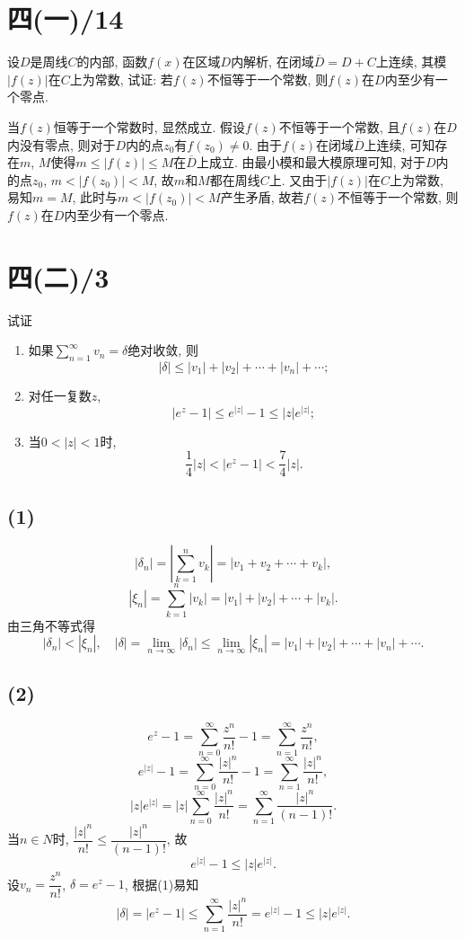 \documentclass[11pt,a4paper]{article}
\author{刘逸灏 (515370910207)}
\begin{document}
\maketitle

\section{四(一)/14}
\begin{problem}
设$D$是周线$C$的内部, 函数$f(x)$在区域$D$内解析, 在闭域$\overline{D}=D+C$上连续, 其模$|f(z)|$在$C$上为常数, 试证: 若$f(z)$不恒等于一个常数, 则$f(z)$在$D$内至少有一个零点.
\end{problem}

当$f(z)$恒等于一个常数时, 显然成立. 假设$f(z)$不恒等于一个常数, 且$f(z)$在$D$内没有零点, 则对于$D$内的点$z_0$有$f(z_0)\neq 0$. 由于$f(z)$在闭域$\overline{D}$上连续, 可知存在$m$, $M$使得$m\leqslant |f(z)|\leqslant M$在$\overline{D}$上成立.
由最小模和最大模原理可知, 对于$D$内的点$z_0$, $m<|f(z_0)|<M$, 故$m$和$M$都在周线$C$上. 又由于$|f(z)|$在$C$上为常数, 易知$m=M$, 此时与$m<|f(z_0)|<M$产生矛盾, 故若$f(z)$不恒等于一个常数, 则$f(z)$在$D$内至少有一个零点.

\section{四(二)/3}
\begin{problem}
试证
\begin{enumerate}
  \item 如果$\sum\limits_{n=1}^\infty v_n=\delta$绝对收敛, 则$$|\delta|\leqslant|v_1|+|v_2|+\cdots+|v_n|+\cdots;$$
  \item 对任一复数$z$, $$|e^z-1|\leqslant e^{|z|}-1\leqslant |z|e^{|z|};$$
  \item 当$0<|z|<1$时, $$\frac{1}{4}|z|<|e^z-1|<\frac{7}{4}|z|.$$
\end{enumerate}
\end{problem}

\subsection*{(1)}
$$|\delta_n|=\left|\sum_{k=1}^n v_k\right|=|v_1+v_2+\cdots+v_k|,$$
$$|\xi_n|=\sum_{k=1}^n |v_k|=|v_1|+|v_2|+\cdots+|v_k|.$$
由三角不等式得
$$|\delta_n|<|\xi_n|,\quad |\delta|=\lim_{n\to\infty}|\delta_n|\leqslant\lim_{n\to\infty}|\xi_n|=|v_1|+|v_2|+\cdots+|v_n|+\cdots.$$

\subsection*{(2)}
$$e^z-1=\sum_{n=0}^\infty\frac{z^n}{n!}-1=\sum_{n=1}^\infty\frac{z^n}{n!},$$
$$e^{|z|}-1=\sum_{n=0}^\infty\frac{|z|^n}{n!}-1=\sum_{n=1}^\infty\frac{|z|^n}{n!},$$
$$|z|e^{|z|}=|z|\sum_{n=0}^\infty\frac{|z|^n}{n!}=\sum_{n=1}^\infty\frac{|z|^n}{(n-1)!}.$$
当$n\in N$时, $\dfrac{|z|^n}{n!}\leqslant \dfrac{|z|^n}{(n-1)!}$, 故
$$e^{|z|}-1\leqslant|z|e^{|z|}.$$
设$v_n=\dfrac{z^n}{n!}$, $\delta=e^z-1$, 根据(1)易知
$$|\delta|=|e^z-1|\leqslant\sum_{n=1}^\infty\frac{|z|^n}{n!}=e^{|z|}-1\leqslant|z|e^{|z|}.$$
\end{document}
